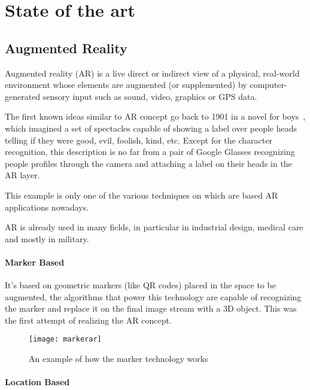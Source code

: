 \chapter{State of the art}

	\section{Augmented Reality}
	
		\begin{quoting}
			Augmented reality (AR) is a live direct or indirect view of a physical, real-world environment whose elements are augmented (or supplemented) by computer-generated sensory input such as sound, video, graphics or GPS data.~\cite{wiki:ar}
		\end{quoting}
		
		The first known ideas similar to AR concept go back to 1901 in a novel for boys~\cite{baum:master}, which imagined a set of spectacles capable of showing a label over people heads telling if they were good, evil, foolish, kind, etc.
		Except for the character recognition, this description is no far from a pair of Google Glasses recognizing people profiles through the camera and attaching a label on their heads in the AR layer.
		
		This example is only one of the various techniques on which are based AR applications nowadays.
		
		AR is already used in many fields, in particular in industrial design, medical care and mostly in military.
		
		\subsubsection{Marker Based}
			
			It's based on geometric markers (like QR codes) placed in the space to be augmented, the algorithms that power this technology are capable of recognizing the marker and replace it on the final image stream with a 3D object.
			This was the first attempt of realizing the AR concept.
			
			\begin{figure}
				\centering
				\texttt{[image: markerar]}
				\caption{An example of how the marker technology works}
			\end{figure}
		
		\subsubsection{Location Based}
		
